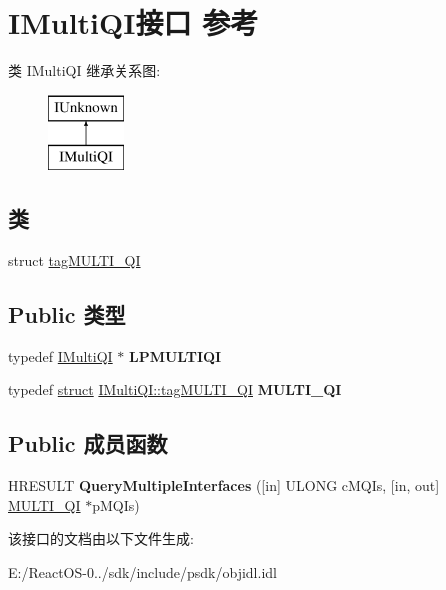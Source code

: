 \hypertarget{interface_i_multi_q_i}{}\section{I\+Multi\+Q\+I接口 参考}
\label{interface_i_multi_q_i}
类 I\+Multi\+QI 继承关系图\+:\begin{figure}[H]
\begin{center}
\leavevmode
\includegraphics[height=2.000000cm]{interface_i_multi_q_i}
\end{center}
\end{figure}
\subsection*{类}
\begin{DoxyCompactItemize}
\item 
struct \hyperlink{struct_i_multi_q_i_1_1tag_m_u_l_t_i___q_i}{tag\+M\+U\+L\+T\+I\+\_\+\+QI}
\end{DoxyCompactItemize}
\subsection*{Public 类型}
\begin{DoxyCompactItemize}
\item 
\mbox{\label{interface_i_multi_q_i_ac289404e8c15aa1c8ffa29a32f16d5e7}} 
typedef \hyperlink{interface_i_multi_q_i}{I\+Multi\+QI} $\ast$ {\bfseries L\+P\+M\+U\+L\+T\+I\+QI}
\item 
\mbox{\label{interface_i_multi_q_i_a55daefee370e6ce6972dd86f6ff82095}} 
typedef \hyperlink{interfacestruct}{struct} \hyperlink{struct_i_multi_q_i_1_1tag_m_u_l_t_i___q_i}{I\+Multi\+Q\+I\+::tag\+M\+U\+L\+T\+I\+\_\+\+QI} {\bfseries M\+U\+L\+T\+I\+\_\+\+QI}
\end{DoxyCompactItemize}
\subsection*{Public 成员函数}
\begin{DoxyCompactItemize}
\item 
\mbox{\label{interface_i_multi_q_i_a0241711123f463d5a1f4e2b56f4743a3}} 
H\+R\+E\+S\+U\+LT {\bfseries Query\+Multiple\+Interfaces} (\mbox{[}in\mbox{]} U\+L\+O\+NG c\+M\+Q\+Is, \mbox{[}in, out\mbox{]} \hyperlink{struct_i_multi_q_i_1_1tag_m_u_l_t_i___q_i}{M\+U\+L\+T\+I\+\_\+\+QI} $\ast$p\+M\+Q\+Is)
\end{DoxyCompactItemize}


该接口的文档由以下文件生成\+:\begin{DoxyCompactItemize}
\item 
E\+:/\+React\+O\+S-\/0../sdk/include/psdk/objidl.\+idl\end{DoxyCompactItemize}
